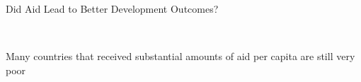 \documentclass[10pt,xcolor=table,ignorenonframetext,handout,aspectratio=169]{beamer}
\begin{document}
\begin{frame}{Did Aid Lead to Better Development Outcomes?}

\begin{center}
	 $\ \ $	 \\
	
	\medskip
	\medskip
	
	Many countries that received substantial amounts of aid per capita are still very poor 
\end{center}

\end{frame}


\end{document}
